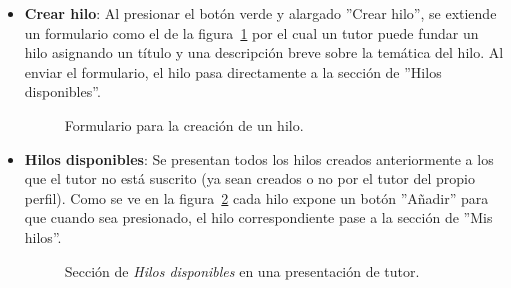 \documentclass[a4paper, 12pt]{book}
\begin{document}
\begin{itemize}
  \item {\bfseries Crear hilo}: Al presionar el bot\'on verde y alargado ''Crear hilo'', se extiende un formulario como el de la figura~\ref{figura:tutor1} 
  por el cual un tutor puede fundar un hilo asignando un t\'itulo y una descripci\'on breve sobre la tem\'atica del hilo. Al enviar el formulario, el hilo 
  pasa directamente a la secci\'on de ''Hilos disponibles''.
  \begin{figure}[htbp] 
    \centering
    \caption{Formulario para la creaci\'on de un hilo.}
    \label{figura:tutor1}
  \end{figure}
  
  \item {\bfseries Hilos disponibles}: Se presentan todos los hilos creados anteriormente a los que el tutor no est\'a suscrito (ya sean creados o no por 
  el tutor del propio perfil). Como se ve en la figura~\ref{figura:tutor2} cada hilo expone un bot\'on ''A\~nadir'' para que cuando sea presionado, el hilo 
  correspondiente pase a la secci\'on de ''Mis hilos''.
  \begin{figure}[htbp] 
    \centering
    \caption{Secci\'on de \textit{Hilos disponibles} en una presentaci\'on de tutor.}
    \label{figura:tutor2}
  \end{figure}
  

\end{itemize}
\end{document}

